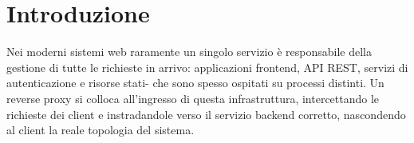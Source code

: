 \section{Introduzione}
Nei moderni sistemi web raramente un singolo servizio è responsabile della gestione di tutte le
richieste in arrivo: applicazioni frontend, API REST, servizi di autenticazione e risorse stati-
che sono spesso ospitati su processi distinti. Un reverse proxy si colloca all’ingresso di questa
infrastruttura, intercettando le richieste dei client e instradandole verso il servizio backend corretto,
nascondendo al client la reale topologia del sistema.
